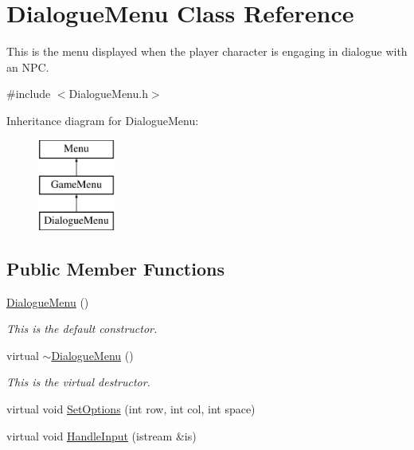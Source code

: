 \hypertarget{classDialogueMenu}{\section{Dialogue\-Menu Class Reference}
\label{classDialogueMenu}
}


This is the menu displayed when the player character is engaging in dialogue with an N\-P\-C.  




{\ttfamily \#include $<$Dialogue\-Menu.\-h$>$}

Inheritance diagram for Dialogue\-Menu\-:\begin{figure}[H]
\begin{center}
\leavevmode
\includegraphics[height=3.000000cm]{classDialogueMenu}
\end{center}
\end{figure}
\subsection*{Public Member Functions}
\begin{DoxyCompactItemize}
\item 
\hyperlink{classDialogueMenu_a062e15c446d9a559a20bfdc19fb190c5}{Dialogue\-Menu} ()
\begin{DoxyCompactList}\small\item\em This is the default constructor. \end{DoxyCompactList}\item 
virtual \hyperlink{classDialogueMenu_a11adf9b9db3cdeca6e0c38f0beec81dc}{$\sim$\-Dialogue\-Menu} ()
\begin{DoxyCompactList}\small\item\em This is the virtual destructor. \end{DoxyCompactList}\item 
virtual void \hyperlink{classDialogueMenu_a0d9ad90b84f6b104b673be1ff66185c2}{Set\-Options} (int row, int col, int space)
\item 
virtual void \hyperlink{classDialogueMenu_af682f751ddb1f30c679a19dcf6703856}{Handle\-Input} (istream \&is)
\end{DoxyCompactItemize}
